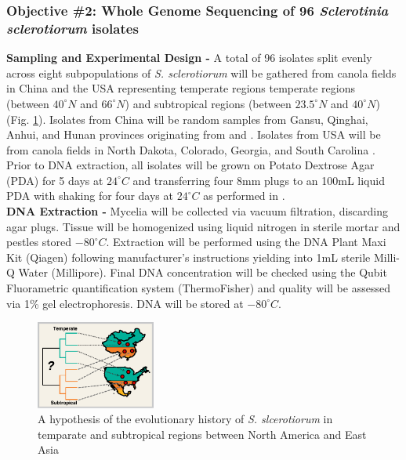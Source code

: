 \documentclass[12pt,letterpaper]{article}
\begin{document}
\subsubsection{Objective \#2: Whole Genome Sequencing of 96 \textit{Sclerotinia sclerotiorum} isolates}

\noindent \textbf{Sampling and Experimental Design -}
A total of 96 isolates split evenly across eight subpopulations of \textit{S. sclerotiorum} will be gathered from canola fields in China and the USA representing temperate regions temperate regions (between $40^{\circ}N$ and $66^{\circ}N$) and subtropical regions (between $23.5^{\circ}N$ and $40^{\circ}N$) (Fig. \ref{fig:us-china}).
Isolates from China will be random samples from Gansu, Qinghai, Anhui, and Hunan provinces originating from \citet{zhou2014dimethachlon} and \citet{attanayake2013sclerotinia}.
Isolates from USA will be from canola fields in North Dakota, Colorado, Georgia, and South Carolina \citep{aldrich-wolfe2015genetic,phillips2002phylogeography}.
Prior to DNA extraction, all isolates will be grown on Potato Dextrose Agar (PDA) for 5 days at $24^{\circ}C$ and transferring four 8mm plugs to an 100mL liquid PDA with shaking for four days at $24^{\circ}C$ as performed in \citet{derbyshire2017complete}.\\
\noindent \textbf{DNA Extraction -}
Mycelia will be collected via vacuum filtration, discarding agar plugs. Tissue will be homogenized using liquid nitrogen in sterile mortar and pestles stored $-80^{\circ}C$. Extraction will be performed using the DNA Plant Maxi Kit (Qiagen) following manufacturer's instructions yielding into 1mL sterile Milli-Q Water (Millipore). Final DNA concentration will be checked using the Qubit Fluorametric quantification system (ThermoFisher) and quality will be assessed via 1\% gel electrophoresis. DNA will be stored at $-80^{\circ}C$.\\
\begin{figure} %
  \includegraphics[width=0.35\textwidth]{figure/us-china.pdf}
  \caption{A hypothesis of the evolutionary history of \textit{S. slcerotiorum} in temparate and subtropical regions between North America and East Asia}
  \label{fig:us-china}
\end{figure}
\end{document}
